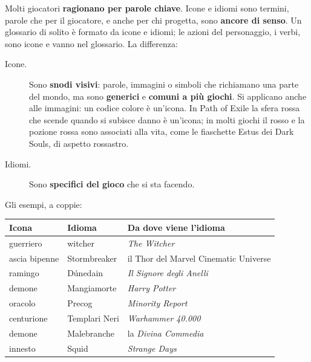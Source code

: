 Molti giocatori \textbf{ragionano per parole chiave}. Icone e idiomi sono termini,
parole che per il giocatore, e anche per chi progetta, sono \textbf{ancore di
senso}. Un glossario di solito è formato da icone e idiomi; le azioni del
personaggio, i verbi, sono icone e vanno nel glossario. La differenza:
\begin{description}
  \item[Icone.] Sono \textbf{snodi visivi}: parole, immagini o simboli che
        richiamano una parte del mondo, ma sono \textbf{generici} e
        \textbf{comuni a più giochi}. Si applicano anche alle immagini: un codice
        colore è un'icona. In Path of Exile la sfera rossa che scende quando si
        subisce danno è un'icona; in molti giochi il rosso e la pozione rossa
        sono associati alla vita, come le fiaschette Estus dei Dark Souls, di
        aspetto rossastro.
  \item[Idiomi.] Sono \textbf{specifici del gioco} che si sta facendo.
\end{description}
Gli esempi, a coppie:
\begin{center}
\begin{tabular}{@{}lll@{}}
  \toprule
  \textbf{Icona} & \textbf{Idioma} & \textbf{Da dove viene l'idioma} \\
  \midrule
  guerriero          & witcher                  & \emph{The Witcher} \\
  ascia bipenne\footnotemark & Stormbreaker      & il Thor del Marvel Cinematic Universe \\
  ramingo            & Dúnedain                 & \emph{Il Signore degli Anelli} \\
  demone             & Mangiamorte              & \emph{Harry Potter} \\
  oracolo            & Precog                   & \emph{Minority Report} \\
  centurione         & Templari Neri            & \emph{Warhammer 40.000}\footnotemark \\
  demone             & Malebranche              & la \emph{Divina Commedia} \\
  innesto            & Squid                    & \emph{Strange Days}\footnotemark \\
  \bottomrule
\end{tabular}
\end{center}
\addtocounter{footnote}{-2}
